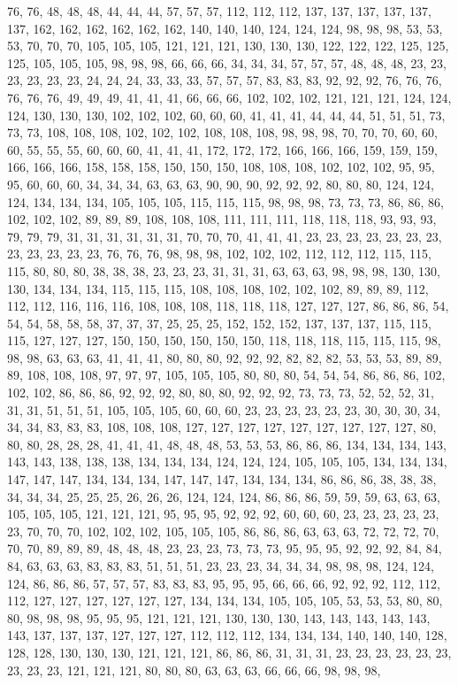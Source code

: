 76, 76, 48, 48, 48, 44, 44, 44, 57, 57, 57, 112, 112, 112, 137, 137, 137, 137, 137, 137, 162, 162, 162, 162, 162, 162, 140, 140, 140, 124, 124, 124, 98, 98, 98, 53, 53, 53, 70, 70, 70, 105, 105, 105, 121, 121, 121, 130, 130, 130, 122, 122, 122, 125, 125, 125, 105, 105, 105, 98, 98, 98, 66, 66, 66, 34, 34, 34, 57, 57, 57, 48, 48, 48, 23, 23, 23, 23, 23, 23, 24, 24, 24, 33, 33, 33, 57, 57, 57, 83, 83, 83, 92, 92, 92, 76, 76, 76, 76, 76, 76, 49, 49, 49, 41, 41, 41, 66, 66, 66, 102, 102, 102, 121, 121, 121, 124, 124, 124, 130, 130, 130, 102, 102, 102, 60, 60, 60, 41, 41, 41, 44, 44, 44, 51, 51, 51, 73, 73, 73, 108, 108, 108, 102, 102, 102, 108, 108, 108, 98, 98, 98, 70, 70, 70, 60, 60, 60, 55, 55, 55, 60, 60, 60, 41, 41, 41, 172, 172, 172, 166, 166, 166, 159, 159, 159, 166, 166, 166, 158, 158, 158, 150, 150, 150, 108, 108, 108, 102, 102, 102, 95, 95, 95, 60, 60, 60, 34, 34, 34, 63, 63, 63, 90, 90, 90, 92, 92, 92, 80, 80, 80, 124, 124, 124, 134, 134, 134, 105, 105, 105, 115, 115, 115, 98, 98, 98, 73, 73, 73, 86, 86, 86, 102, 102, 102, 89, 89, 89, 108, 108, 108, 111, 111, 111, 118, 118, 118, 93, 93, 93, 79, 79, 79, 31, 31, 31, 31, 31, 31, 70, 70, 70, 41, 41, 41, 23, 23, 23, 23, 23, 23, 23, 23, 23, 23, 23, 23, 76, 76, 76, 98, 98, 98, 102, 102, 102, 112, 112, 112, 115, 115, 115, 80, 80, 80, 38, 38, 38, 23, 23, 23, 31, 31, 31, 63, 63, 63, 98, 98, 98, 130, 130, 130, 134, 134, 134, 115, 115, 115, 108, 108, 108, 102, 102, 102, 89, 89, 89, 112, 112, 112, 116, 116, 116, 108, 108, 108, 118, 118, 118, 127, 127, 127, 86, 86, 86, 54, 54, 54, 58, 58, 58, 37, 37, 37, 25, 25, 25, 152, 152, 152, 137, 137, 137, 115, 115, 115, 127, 127, 127, 150, 150, 150, 150, 150, 150, 118, 118, 118, 115, 115, 115, 98, 98, 98, 63, 63, 63, 41, 41, 41, 80, 80, 80, 92, 92, 92, 82, 82, 82, 53, 53, 53, 89, 89, 89, 108, 108, 108, 97, 97, 97, 105, 105, 105, 80, 80, 80, 54, 54, 54, 86, 86, 86, 102, 102, 102, 86, 86, 86, 92, 92, 92, 80, 80, 80, 92, 92, 92, 73, 73, 73, 52, 52, 52, 31, 31, 31, 51, 51, 51, 105, 105, 105, 60, 60, 60, 23, 23, 23, 23, 23, 23, 30, 30, 30, 34, 34, 34, 83, 83, 83, 108, 108, 108, 127, 127, 127, 127, 127, 127, 127, 127, 127, 80, 80, 80, 28, 28, 28, 41, 41, 41, 48, 48, 48, 53, 53, 53, 86, 86, 86, 134, 134, 134, 143, 143, 143, 138, 138, 138, 134, 134, 134, 124, 124, 124, 105, 105, 105, 134, 134, 134, 147, 147, 147, 134, 134, 134, 147, 147, 147, 134, 134, 134, 86, 86, 86, 38, 38, 38, 34, 34, 34, 25, 25, 25, 26, 26, 26, 124, 124, 124, 86, 86, 86, 59, 59, 59, 63, 63, 63, 105, 105, 105, 121, 121, 121, 95, 95, 95, 92, 92, 92, 60, 60, 60, 23, 23, 23, 23, 23, 23, 70, 70, 70, 102, 102, 102, 105, 105, 105, 86, 86, 86, 63, 63, 63, 72, 72, 72, 70, 70, 70, 89, 89, 89, 48, 48, 48, 23, 23, 23, 73, 73, 73, 95, 95, 95, 92, 92, 92, 84, 84, 84, 63, 63, 63, 83, 83, 83, 51, 51, 51, 23, 23, 23, 34, 34, 34, 98, 98, 98, 124, 124, 124, 86, 86, 86, 57, 57, 57, 83, 83, 83, 95, 95, 95, 66, 66, 66, 92, 92, 92, 112, 112, 112, 127, 127, 127, 127, 127, 127, 134, 134, 134, 105, 105, 105, 53, 53, 53, 80, 80, 80, 98, 98, 98, 95, 95, 95, 121, 121, 121, 130, 130, 130, 143, 143, 143, 143, 143, 143, 137, 137, 137, 127, 127, 127, 112, 112, 112, 134, 134, 134, 140, 140, 140, 128, 128, 128, 130, 130, 130, 121, 121, 121, 86, 86, 86, 31, 31, 31, 23, 23, 23, 23, 23, 23, 23, 23, 23, 121, 121, 121, 80, 80, 80, 63, 63, 63, 66, 66, 66, 98, 98, 98, 